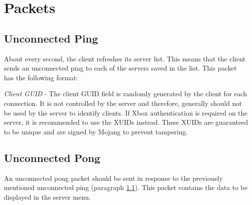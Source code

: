 \section{Packets}\label{sec:raknet-packets}

\subsection{Unconnected Ping}\label{subsec:unconnected-ping}

About every second, the client refreshes its server list.
This means that the client sends an unconnected ping to each of the servers saved in the list.
This packet has the following format:


\textit{Client GUID} - The client GUID field is randomly generated by the client for each connection.
It is not controlled by the server and therefore, generally should not be used by the server to identify clients.
If Xbox authentication is required on the server, it is recommended to use the XUIDs instead.
These XUIDs are guaranteed to be unique and are signed by Mojang to prevent tampering.

\subsection{Unconnected Pong}\label{subsec:unconnected-pong}

An unconnected pong packet should be sent in response to the previously mentioned unconnected ping (paragraph \ref{subsec:unconnected-ping}).
This packet contains the data to be displayed in the server menu.



